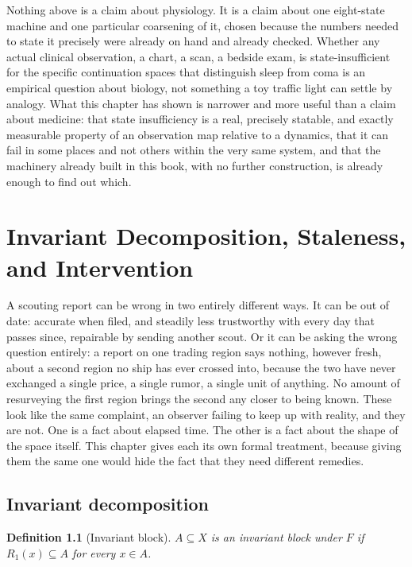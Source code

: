 \documentclass[11pt]{report}
\newtheorem{definition}{Definition}[chapter]
\begin{document}
Nothing above is a claim about physiology. It is a claim about one
eight-state machine and one particular coarsening of it, chosen
because the numbers needed to state it precisely were already on hand
and already checked. Whether any actual clinical observation, a chart,
a scan, a bedside exam, is state-insufficient for the specific
continuation spaces that distinguish sleep from coma is an empirical
question about biology, not something a toy traffic light can settle
by analogy. What this chapter has shown is narrower and more useful
than a claim about medicine: that state insufficiency is a real,
precisely statable, and exactly measurable property of an observation
map relative to a dynamics, that it can fail in some places and not
others within the very same system, and that the machinery already
built in this book, with no further construction, is already enough
to find out which.

\chapter{Invariant Decomposition, Staleness, and Intervention}

A scouting report can be wrong in two entirely different ways. It can
be out of date: accurate when filed, and steadily less trustworthy
with every day that passes since, repairable by sending another scout.
Or it can be asking the wrong question entirely: a report on one
trading region says nothing, however fresh, about a second region no
ship has ever crossed into, because the two have never exchanged a
single price, a single rumor, a single unit of anything. No amount of
resurveying the first region brings the second any closer to being
known. These look like the same complaint, an observer failing to
keep up with reality, and they are not. One is a fact about elapsed
time. The other is a fact about the shape of the space itself. This
chapter gives each its own formal treatment, because giving them the
same one would hide the fact that they need different remedies.

\section*{Invariant decomposition}

\begin{definition}[Invariant block]
$A \subseteq X$ is an invariant block under $F$ if $R_1(x) \subseteq
A$ for every $x \in A$.
\end{definition}
\end{document}
